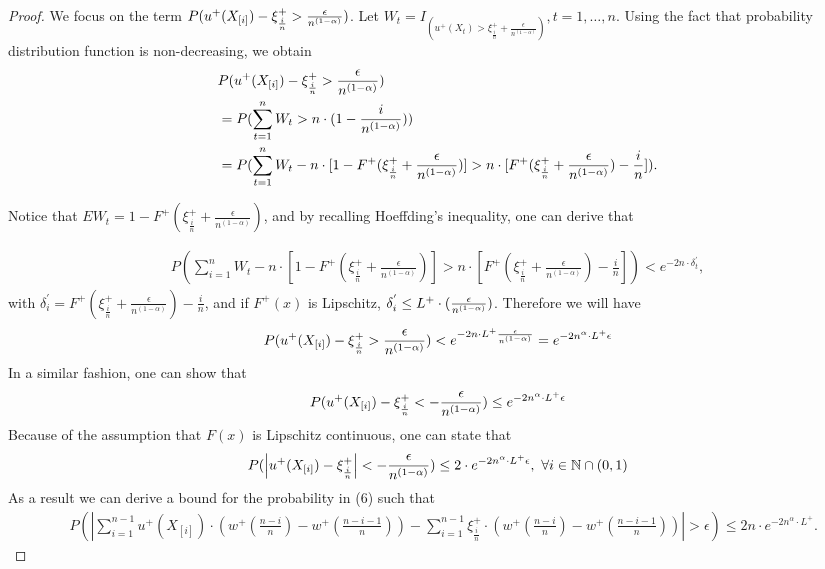 \begin{proof}
\noindent We focus on the term 
$
P ( u^+(X_{[i]}) - \xi^+_{\frac{i}{n}} > \frac {\epsilon}{n^{(1-\alpha)}})
$.
Let $W_t = I_{(u^+(X_t) > \xi^+_{\frac{i}{n}} + \frac{\epsilon}{n^{(1-\alpha)}})}, t=1, \ldots,n.$ Using the fact that probability distribution function is non-decreasing, we obtain 
\begin{align*}
& P ( u^+(X_{[i]}) - \xi^+_{\frac{i}{n}} > \frac {\epsilon}{n^{(1-\alpha)}}) \\ & = P ( \sum _{t=1}^{n} W_t >
n\cdot(1-\frac{i}{n^{(1-\alpha)}})) \\ & = P ( \sum _{t=1}^{n} W_t - n \cdot [1-F^{+}(\xi^+_{\frac{i}{n}}
+\frac{\epsilon}{n^{(1-\alpha)}})] > n \cdot [F^{+}(\xi^+_{\frac{i}{n}} +\frac{\epsilon}{n^{(1-\alpha)}})
- \frac{i}{n}]).
\end{align*}

\noindent Notice that 
$E W_t = 1-F^{+}(\xi^+_{\frac{i}{n}} +\frac{\epsilon}{n^{(1-\alpha)}})$, and by recalling Hoeffding's inequality, one can derive that

\begin{align}
P ( \sum _{i=1}^{n} W_t - n \cdot [1-F^{+}(\xi^+_{\frac{i}{n}} +\frac{\epsilon}{n^{(1-\alpha) }  } ) ] > n
\cdot [F^{+}(\xi^+_{\frac{i}{n}} +\frac{\epsilon}{n^{(1-\alpha)} } ) - \frac{i}{n}]) < e^{-2n\cdot
\delta^{'}_t},
\end{align}
with $\delta^{'}_i = F^{+}(\xi^+_{\frac{i}{n}} +\frac{\epsilon} {n^{(1-\alpha)} }) - \frac{i}{n}$, and if 
$F^{+}(x)$ is Lipschitz, $ \delta^{'}_i \leq L^{+} \cdot (\frac{\epsilon}{n^{(1-\alpha)}})$.
Therefore we will have
\begin{align}
P ( u^+(X_{[i]}) - \xi^+_{\frac{i}{n}} > \frac {\epsilon}{n^{(1-\alpha)}}) < e^{-2n\cdot L^{+}
\frac{\epsilon}{n^{(1-\alpha)}} } = e^{-2n^\alpha \cdot L ^{+} \epsilon}
\end{align}
In a  similar fashion, one can show that 
\begin{align*}
P ( u^+(X_{[i]}) -\xi^+_{\frac{i}{n}} < -\frac {\epsilon} {n^{(1-\alpha)}}) \leq e^{-2n^\alpha \cdot L^{+}  \epsilon}
\end{align*}
Because of the assumption that $F(x)$ is Lipschitz continuous, one can state that 
\begin{align*}
P ( \left| u^+(X_{[i]}) -\xi^+_{\frac{i}{n}} \right| < -\frac {\epsilon} {n^{(1-\alpha)}}) \leq 2\cdot
e^{-2n^\alpha \cdot L^{+} \epsilon} , \text{   }\forall i\in \mathbb{N} \cap (0,1) 
\end{align*}
As a result we can derive a bound for the probability in (6) such that
\begin{align}
&
P ( \left| \sum_{i=1}^{n-1} u^+(X_{[i]}) \cdot (w^+(\frac{n-i}{n} )  - w^+(\frac{n-i-1}{n} ) ) -
\sum_{i=1}^{n-1} \xi^+_{\frac{i}{n}} \cdot (w^+(\frac{n-i}{n} )  - w^+(\frac{n-i-1}{n} ) ) \right| >
\epsilon) \leq 2n\cdot e^{-2n^\alpha \cdot L^{+}}.\label{eq:holder-sample-complexity-extract}
\end{align}


\end{proof}
